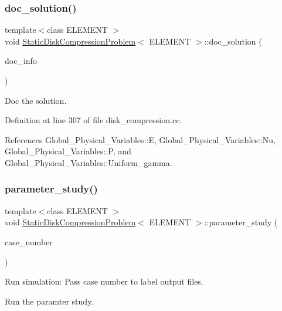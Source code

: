 \subsubsection{\texorpdfstring{doc\+\_\+solution()}{doc\_solution()}}
{\footnotesize\ttfamily template$<$class E\+L\+E\+M\+E\+NT $>$ \\
void \hyperlink{classStaticDiskCompressionProblem}{Static\+Disk\+Compression\+Problem}$<$ E\+L\+E\+M\+E\+NT $>$\+::doc\+\_\+solution (\begin{DoxyParamCaption}\item[{Doc\+Info \&}]{doc\+\_\+info }\end{DoxyParamCaption})}



Doc the solution. 



Definition at line 307 of file disk\+\_\+compression.\+cc.



References Global\+\_\+\+Physical\+\_\+\+Variables\+::E, Global\+\_\+\+Physical\+\_\+\+Variables\+::\+Nu, Global\+\_\+\+Physical\+\_\+\+Variables\+::P, and Global\+\_\+\+Physical\+\_\+\+Variables\+::\+Uniform\+\_\+gamma.

\mbox{\label{classStaticDiskCompressionProblem_ac64db4786efde78e70b1110422331b02}} 
\subsubsection{\texorpdfstring{parameter\+\_\+study()}{parameter\_study()}}
{\footnotesize\ttfamily template$<$class E\+L\+E\+M\+E\+NT $>$ \\
void \hyperlink{classStaticDiskCompressionProblem}{Static\+Disk\+Compression\+Problem}$<$ E\+L\+E\+M\+E\+NT $>$\+::parameter\+\_\+study (\begin{DoxyParamCaption}\item[{const unsigned \&}]{case\+\_\+number }\end{DoxyParamCaption})}



Run simulation\+: Pass case number to label output files. 

Run the paramter study. 

